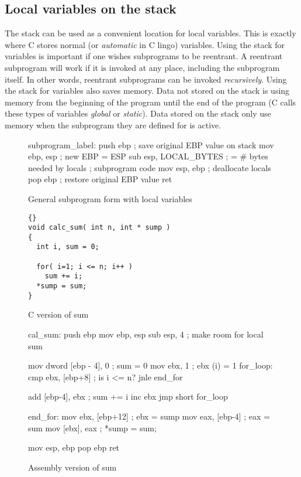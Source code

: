 \subsection{Local variables on the stack}

The stack can be used as a convenient location for local variables. This is
exactly where C stores normal (or \emph{automatic} in C lingo) variables.
Using the stack for variables is important if one wishes subprograms to be
reentrant. A reentrant subprogram will work if it is invoked at any place,
including the subprogram itself. In other words, reentrant subprograms
can be invoked \emph{recursively}. Using the stack for variables also saves
memory. Data not stored on the stack is using memory from the beginning of
the program until the end of the program (C calls these types of variables
\emph{global} or \emph{static}). Data stored on the stack only use memory
when the subprogram they are defined for is active.

\begin{figure}[t]
\begin{AsmCodeListing}[frame=single]
subprogram_label:
      push   ebp                ; save original EBP value on stack
      mov    ebp, esp           ; new EBP = ESP
      sub    esp, LOCAL_BYTES   ; = # bytes needed by locals
; subprogram code
      mov    esp, ebp           ; deallocate locals
      pop    ebp                ; restore original EBP value
      ret
\end{AsmCodeListing}
\caption{General subprogram form with local variables\label{fig:subskel2}}
\end{figure}

\begin{figure}[t]
\begin{lstlisting}[frame=tlrb]{}
void calc_sum( int n, int * sump )
{
  int i, sum = 0;

  for( i=1; i <= n; i++ )
    sum += i;
  *sump = sum;
}
\end{lstlisting}
\caption{C version of sum \label{fig:Csum}}
\end{figure}

\begin{figure}[t]
\begin{AsmCodeListing}[frame=single]
cal_sum:
      push   ebp
      mov    ebp, esp
      sub    esp, 4               ; make room for local sum

      mov    dword [ebp - 4], 0   ; sum = 0
      mov    ebx, 1               ; ebx (i) = 1
for_loop:
      cmp    ebx, [ebp+8]         ; is i <= n?
      jnle   end_for

      add    [ebp-4], ebx         ; sum += i
      inc    ebx
      jmp    short for_loop

end_for:
      mov    ebx, [ebp+12]        ; ebx = sump
      mov    eax, [ebp-4]         ; eax = sum
      mov    [ebx], eax           ; *sump = sum;

      mov    esp, ebp
      pop    ebp
      ret
\end{AsmCodeListing}
\caption{Assembly version of sum\label{fig:Asmsum}}
\end{figure}

